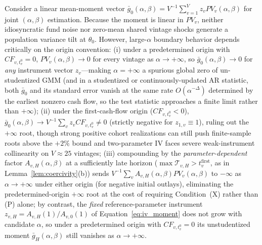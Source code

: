 \begin{remark}
\label{rem:iv_alpha}
Consider a linear mean-moment vector $\bar{g}_0(\alpha,\beta) = V^{-1}\sum_{v=1}^V z_v PV_v(\alpha,\beta)$ for joint $(\alpha,\beta)$ estimation. Because the moment is linear in $PV_v$, neither idiosyncratic fund noise nor zero-mean shared vintage shocks generate a population variance tilt at $\theta_0$. However, large-$\alpha$ boundary behavior depends critically on the origin convention:
(i) under a predetermined origin with $CF_{v,t_v^0} = 0$, $PV_v(\alpha,\beta) \to 0$ for every vintage as $\alpha \to +\infty$, so $\bar{g}_0(\alpha,\beta) \to 0$ for \emph{any} instrument vector $z_v$---making $\alpha = +\infty$ a spurious global zero of un-studentized GMM (and in a studentized or continuously-updated AR statistic, both $\bar{g}_0$ and its standard error vanish at the same rate $O(\alpha^{-\Delta})$ determined by the earliest nonzero cash flow, so the test statistic approaches a finite limit rather than $+\infty$);
(ii) under the first-cash-flow origin ($CF_{v,t_v^0} < 0$), $\bar{g}_0(\alpha,\beta) \to V^{-1}\sum_v z_v CF_{v,t_v^0} \neq 0$ (strictly negative for $z_{1,v} \equiv 1$), ruling out the $+\infty$ root, though strong positive cohort realizations can still push finite-sample roots above the $+2\%$ bound and two-parameter IV faces severe weak-instrument collinearity on $V \approx 25$ vintages;
(iii) compounding by the \emph{parameter-dependent} factor $A_{v,H}(\alpha,\beta)$ at a sufficiently late horizon ($\max\mathcal{T}_{v,H} > t_v^{\mathrm{first}}$, as in Lemma~\ref{lem:coercivity}(b)) sends $V^{-1}\sum_v A_{v,H}(\alpha,\beta)PV_v(\alpha,\beta)$ to $-\infty$ as $\alpha \to +\infty$ under either origin (for negative initial outlays), eliminating the predetermined-origin $+\infty$ root at the cost of requiring Condition~(X) rather than (P) alone; by contrast, the \emph{fixed} reference-parameter instrument $z_{v,H} = A_{v,H}(1)/A_{v,0}(1)$ of Equation~\eqref{eq:iv_moment} does not grow with candidate $\alpha$, so under a predetermined origin with $CF_{v,t_v^0} = 0$ its unstudentized moment $\bar{g}_H(\alpha,\beta)$ still vanishes as $\alpha \to +\infty$.
\end{remark}

